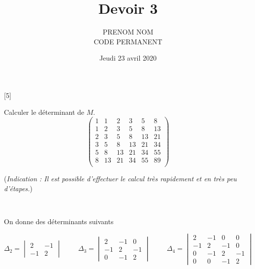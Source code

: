 \documentclass[letter,addpoints,12pt]{exam}
\title{{\Large{\textbf{Devoir 3}}}}
\date{Jeudi 23 avril 2020}
\author{PRENOM NOM \\ CODE PERMANENT}
\begin{document}
\maketitle 
\thispagestyle{headandfoot}

\hrulefill

\pointsinrightmargin


\begin{questions}

\vspace*{.5cm}	
[5] ~
	
	Calculer le déterminant de $M$. 
	$$\begin{pmatrix}
	1 & 1 & 2 & 3 & 5 & 8 \\
	1 & 2 & 3 & 5 & 8 & 13 \\
	2 & 3 & 5 & 8 & 13 & 21 \\
	3 & 5 & 8 & 13 & 21 & 34 \\
	5 & 8 & 13 & 21 & 34 & 55 \\
	8 & 13 & 21 & 34 & 55 & 89 \\
	\end{pmatrix}$$
	
	(\textit{Indication : Il est possible d'effectuer le calcul très rapidement et en très peu d'étapes.})
	
	\begin{solutionorbox}
	\end{solutionorbox}
	
	\vspace*{.5cm}
	 ~
	
	On donne des déterminants suivants 
	
	$$\Delta_2 = \begin{vmatrix}
	2 & -1 \\ -1 & 2
	\end{vmatrix} \hspace{1cm}
	\Delta_3 = \begin{vmatrix}
	2 & -1 & 0 \\ -1 & 2 & -1 \\ 0 & -1 & 2
	\end{vmatrix} \hspace{1cm}
	\Delta_4 = \begin{vmatrix}
	2 & -1 & 0 & 0 \\ -1 & 2 & -1 & 0 \\ 0 & -1 & 2 & -1 \\ 0 & 0 & -1 & 2
	\end{vmatrix}$$
	

\end{questions}
\end{document}
